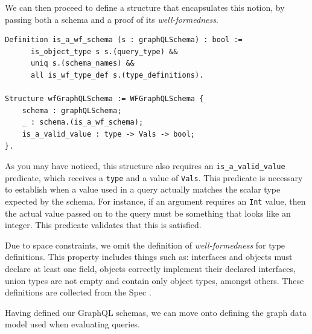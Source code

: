We can then proceed to define a structure that encapsulates this notion, by passing both a schema and a proof of its \textit{well-formedness}. 

\begin{verbatim}
Definition is_a_wf_schema (s : graphQLSchema) : bool :=
      is_object_type s s.(query_type) &&
      uniq s.(schema_names) &&
      all is_wf_type_def s.(type_definitions).

Structure wfGraphQLSchema := WFGraphQLSchema {
    schema : graphQLSchema;
    _ : schema.(is_a_wf_schema);
    is_a_valid_value : type -> Vals -> bool;
}.
\end{verbatim}

As you may have noticed, this structure also requires an \texttt{is_a_valid_value} predicate, which receives a \texttt{type} and a value of \texttt{Vals}. This predicate is necessary to establish when a value used in a query actually matches the scalar type expected by the schema. For instance, if an argument requires an \texttt{Int} value, then the actual value passed on to the query must be something that looks like an integer. This predicate validates that this is satisfied.

Due to space constraints, we omit the definition of \textit{well-formedness} for type definitions. This property includes things such as: interfaces and objects must declare at least one field, objects correctly implement their declared interfaces, union types are not empty and contain only object types, amongst others. These definitions are collected from the Spec .

Having defined our GraphQL schemas, we can move onto defining the graph data model used when evaluating queries.

